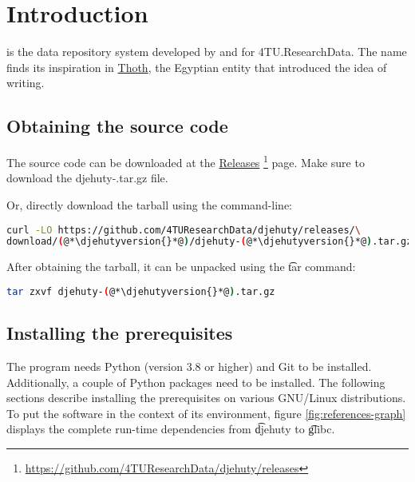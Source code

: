 \chapter{Introduction}

 is the data repository system developed by and for
4TU.ResearchData.  The name finds its inspiration in
\href{https://en.wikipedia.org/wiki/Thoth}{Thoth}, the Egyptian
entity that introduced the idea of writing.

\section{Obtaining the source code}
\label{sec:obtaining-tarball}

  \begin{sloppypar}
  The source code can be downloaded at the
  \href{https://github.com/4TUResearchData/djehuty/releases}%
  {Releases}%
  \footnote{\url{https://github.com/4TUResearchData/djehuty/releases}}
  page.  Make sure to download the {\fontfamily{\ttdefault}\selectfont
    djehuty-\djehutyversion{}.tar.gz} file.
  \end{sloppypar}

  Or, directly download the tarball using the command-line:

\begin{lstlisting}[language=bash]
curl -LO https://github.com/4TUResearchData/djehuty/releases/\
download/(@*\djehutyversion{}*@)/djehuty-(@*\djehutyversion{}*@).tar.gz
\end{lstlisting}

  After obtaining the tarball, it can be unpacked using the \t{tar}
  command:

\begin{lstlisting}[language=bash]
tar zxvf djehuty-(@*\djehutyversion{}*@).tar.gz
\end{lstlisting}

\section{Installing the prerequisites}
\label{sec:prerequisites}

  The  program needs Python (version 3.8 or higher) and
  Git to be installed.  Additionally, a couple of Python packages need
  to be installed.  The following sections describe installing the
  prerequisites on various GNU/Linux distributions.  To put the software in
  the context of its environment, figure \ref{fig:references-graph} displays
  the complete run-time dependencies from \t{djehuty} to \t{glibc}.

